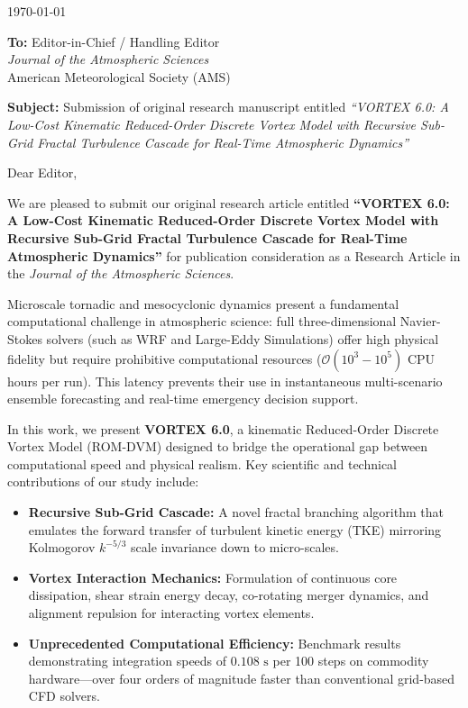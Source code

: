 \documentclass[11pt, a4paper]{article}
\begin{document}
\begin{raggedleft}
\today
\end{raggedleft}

\vspace{0.5cm}

\textbf{To:} Editor-in-Chief / Handling Editor \\
\textit{Journal of the Atmospheric Sciences} \\
American Meteorological Society (AMS)

\vspace{0.5cm}

\textbf{Subject:} Submission of original research manuscript entitled \textit{``VORTEX 6.0: A Low-Cost Kinematic Reduced-Order Discrete Vortex Model with Recursive Sub-Grid Fractal Turbulence Cascade for Real-Time Atmospheric Dynamics''}

\vspace{0.5cm}

Dear Editor,

We are pleased to submit our original research article entitled \textbf{``VORTEX 6.0: A Low-Cost Kinematic Reduced-Order Discrete Vortex Model with Recursive Sub-Grid Fractal Turbulence Cascade for Real-Time Atmospheric Dynamics''} for publication consideration as a Research Article in the \textit{Journal of the Atmospheric Sciences}.

Microscale tornadic and mesocyclonic dynamics present a fundamental computational challenge in atmospheric science: full three-dimensional Navier-Stokes solvers (such as WRF and Large-Eddy Simulations) offer high physical fidelity but require prohibitive computational resources ($\mathcal{O}(10^3 - 10^5)$ CPU hours per run). This latency prevents their use in instantaneous multi-scenario ensemble forecasting and real-time emergency decision support.

In this work, we present \textbf{VORTEX 6.0}, a kinematic Reduced-Order Discrete Vortex Model (ROM-DVM) designed to bridge the operational gap between computational speed and physical realism. Key scientific and technical contributions of our study include:
\begin{itemize}
    \item \textbf{Recursive Sub-Grid Cascade:} A novel fractal branching algorithm that emulates the forward transfer of turbulent kinetic energy (TKE) mirroring Kolmogorov $k^{-5/3}$ scale invariance down to micro-scales.
    \item \textbf{Vortex Interaction Mechanics:} Formulation of continuous core dissipation, shear strain energy decay, co-rotating merger dynamics, and alignment repulsion for interacting vortex elements.
    \item \textbf{Unprecedented Computational Efficiency:} Benchmark results demonstrating integration speeds of $0.108\text{ s}$ per 100 steps on commodity hardware---over four orders of magnitude faster than conventional grid-based CFD solvers.
\end{itemize}
\end{document}
